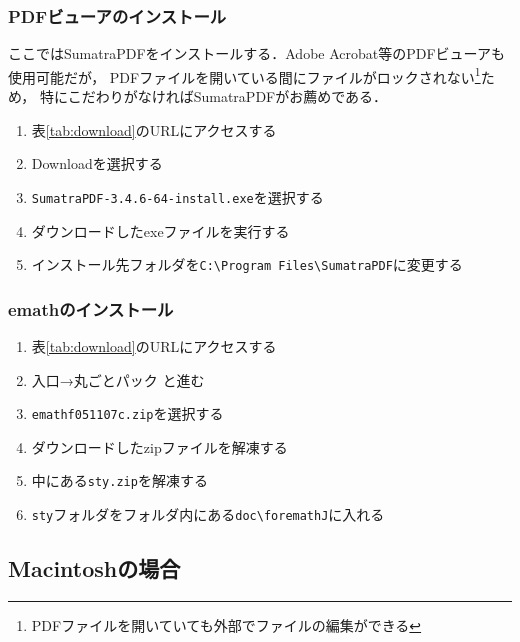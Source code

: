 \subsubsection{PDFビューアのインストール}
ここではSumatraPDFをインストールする．Adobe Acrobat等のPDFビューアも使用可能だが，
PDFファイルを開いている間にファイルがロックされない\footnote{PDFファイルを開いていても外部でファイルの編集ができる}ため，
特にこだわりがなければSumatraPDFがお薦めである．
\begin{enumerate}
    \item 表\ref{tab:download}のURLにアクセスする
    \item Downloadを選択する
    \item \verb|SumatraPDF-3.4.6-64-install.exe|を選択する
    \item ダウンロードしたexeファイルを実行する
    \item インストール先フォルダを\verb|C:\Program Files\SumatraPDF|に変更する
\end{enumerate}

\subsubsection{emathのインストール}
\begin{enumerate}
    \item 表\ref{tab:download}のURLにアクセスする
    \item 入口→丸ごとパック と進む
    \item \verb|emathf051107c.zip|を選択する
    \item ダウンロードしたzipファイルを解凍する
    \item 中にある\verb|sty.zip|を解凍する
    \item \verb|sty|フォルダを{\ketcindy}フォルダ内にある\verb|doc\foremathJ|に入れる
\end{enumerate}

\subsection{Macintoshの場合}

